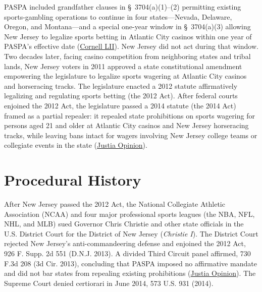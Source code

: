 \documentclass[12pt]{article}
\begin{document}
PASPA included grandfather clauses in \S~3704(a)(1)--(2) permitting existing sports-gambling operations to continue in four states---Nevada, Delaware, Oregon, and Montana---and a special one-year window in \S~3704(a)(3) allowing New Jersey to legalize sports betting in Atlantic City casinos within one year of PASPA's effective date (\href{https://www.law.cornell.edu/supremecourt/text/16-476}{Cornell LII}). New Jersey did not act during that window. Two decades later, facing casino competition from neighboring states and tribal lands, New Jersey voters in 2011 approved a state constitutional amendment empowering the legislature to legalize sports wagering at Atlantic City casinos and horseracing tracks. The legislature enacted a 2012 statute affirmatively legalizing and regulating sports betting (the 2012 Act). After federal courts enjoined the 2012 Act, the legislature passed a 2014 statute (the 2014 Act) framed as a partial repealer: it repealed state prohibitions on sports wagering for persons aged 21 and older at Atlantic City casinos and New Jersey horseracing tracks, while leaving bans intact for wagers involving New Jersey college teams or collegiate events in the state (\href{https://supreme.justia.com/cases/federal/us/584/16-476/}{Justia Opinion}).

\section{Procedural History}

After New Jersey passed the 2012 Act, the National Collegiate Athletic Association (NCAA) and four major professional sports leagues (the NBA, NFL, NHL, and MLB) sued Governor Chris Christie and other state officials in the U.S. District Court for the District of New Jersey (\textit{Christie I}). The District Court rejected New Jersey's anti-commandeering defense and enjoined the 2012 Act, 926 F. Supp. 2d 551 (D.N.J. 2013). A divided Third Circuit panel affirmed, 730 F.3d 208 (3d Cir. 2013), concluding that PASPA imposed no affirmative mandate and did not bar states from repealing existing prohibitions (\href{https://supreme.justia.com/cases/federal/us/584/16-476/}{Justia Opinion}). The Supreme Court denied certiorari in June 2014, 573 U.S. 931 (2014).
\end{document}
